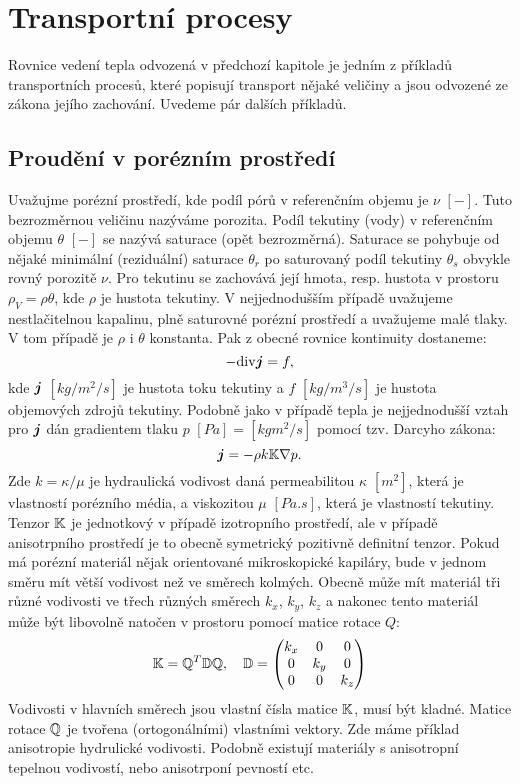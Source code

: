 \section{Transportní procesy}
Rovnice vedení tepla odvozená v předchozí kapitole je jedním z příkladů transportních procesů, které popisují transport nějaké veličiny a
jsou odvozené ze zákona jejího zachování. Uvedeme pár dalších příkladů.

\subsection{Proudění v porézním prostředí}
Uvažujme porézní prostředí, kde podíl pórů v referenčním objemu je $\nu$ $[-]$. Tuto bezrozměrnou veličinu nazýváme porozita. 
Podíl tekutiny (vody) v referenčním objemu $\theta$ $[-]$ se nazývá saturace (opět bezrozměrná). Saturace se pohybuje od nějaké minimální (reziduální)
saturace $\theta_r$ po saturovaný podíl tekutiny $\theta_s$ obvykle rovný porozitě $\nu$. Pro tekutinu se zachovává její hmota, resp. hustota v prostoru
$\rho_V = \rho \theta$, 
kde $\rho$ je hustota tekutiny. V nejjednodušším případě uvažujeme nestlačitelnou kapalinu, plně saturovné porézní prostředí
a uvažujeme malé tlaky. V tom případě je $\rho$ i $\theta$ konstanta. Pak z obecné rovnice kontinuity dostaneme:
\[
    -{\rm div} \mathbf{\boldsymbol{j}} = f,
\]
kde $\mathbf{\boldsymbol{j}}$ $[kg/m^2/s]$ je hustota toku tekutiny  a $f$ $[kg/m^3/s]$ je hustota objemových zdrojů tekutiny. Podobně jako v případě tepla 
je nejjednodušší vztah pro $\mathbf{\boldsymbol{j}}$ dán gradientem tlaku $p$ $[Pa]=[kgm^2/s]$ pomocí tzv. Darcyho zákona:
\[
    \mathbf{\boldsymbol{j}} = -\rho k{\mathbb{K}} \nabla p.
\]
Zde $k=\kappa/\mu$ je hydraulická vodivost daná permeabilitou $\kappa$ $[m^2]$, která je vlastností porézního média, a viskozitou $\mu$ $[Pa.s]$, 
která je vlastností tekutiny. Tenzor ${\mathbb{K}}$ je jednotkový v případě izotropního prostředí, ale v případě anisotrpního prostředí je to obecně symetrický 
pozitivně definitní tenzor. Pokud má porézní materiál nějak orientované mikroskopické kapiláry, bude v jednom směru mít větší vodivost než ve směrech kolmých. 
Obecně může mít materiál tři různé vodivosti ve třech různých směrech $k_x$, $k_y$, $k_z$ a nakonec tento materiál může být libovolně natočen v prostoru 
pomocí matice rotace $Q$:
\[
    {\mathbb{K}} = {\mathbb{Q}}^T {\mathbb{D}} {\mathbb{Q}},\quad 
    {\mathbb{D}} = \begin{pmatrix}
                k_x     &0      &0\\
                0       &k_y    &0\\
                0       &0      &k_z                
            \end{pmatrix}
\]
Vodivosti v hlavních směrech jsou vlastní čísla matice ${\mathbb{K}}$, musí být kladné. Matice rotace ${\mathbb{Q}}$ je tvořena (ortogonálními) vlastními vektory.
Zde máme příklad anisotropie hydrulické vodivosti. Podobně existují materiály s anisotropní tepelnou vodivostí, nebo anisotrponí pevností etc.

